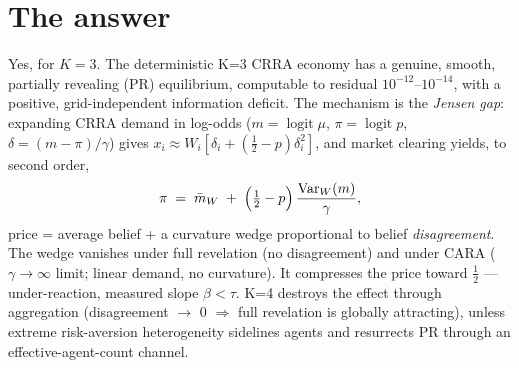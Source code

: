 \documentclass[11pt]{report}
\begin{document}
\section*{The answer}
Yes, for $K = 3$. The deterministic K=3 CRRA economy has a genuine,
smooth, partially revealing (PR) equilibrium, computable to residual
$10^{-12}$--$10^{-14}$, with a positive, grid-independent information
deficit. The mechanism is the \emph{Jensen gap}: expanding CRRA demand in
log-odds ($m = \operatorname{logit}\mu$, $\pi = \operatorname{logit}p$,
$\delta = (m - \pi)/\gamma$) gives $x_i \approx W_i[\delta_i +
(\tfrac12 - p)\delta_i^2]$, and market clearing yields, to second order,
\[
  \pi \;=\; \bar m_W \;+\; \Bigl(\tfrac12 - p\Bigr)\,
            \frac{\mathrm{Var}_W(m)}{\gamma},
\]
price = average belief + a curvature wedge proportional to belief
\emph{disagreement}. The wedge vanishes under full revelation (no
disagreement) and under CARA ($\gamma \to \infty$ limit; linear demand,
no curvature). It compresses the price toward $\tfrac12$ ---
under-reaction, measured slope $\beta < \tau$. K=4 destroys the effect
through aggregation (disagreement $\to$ 0 $\Rightarrow$ full revelation
is globally attracting), unless extreme risk-aversion heterogeneity
sidelines agents and resurrects PR through an effective-agent-count
channel.
\end{document}
